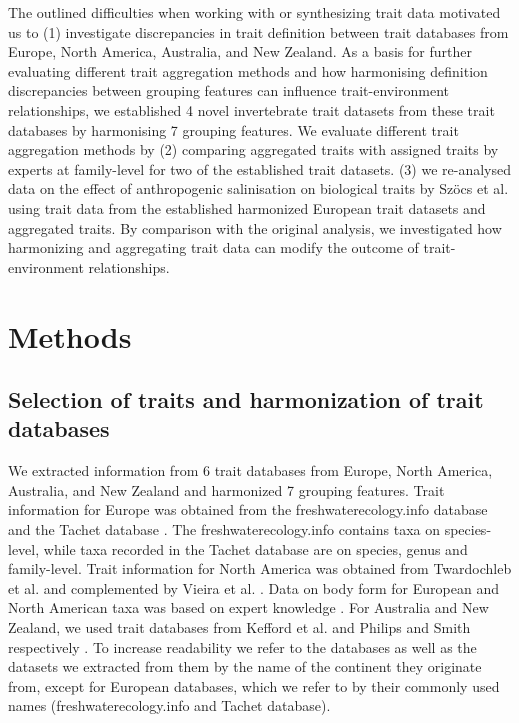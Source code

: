 \documentclass{article}
\begin{document}
The outlined difficulties when working with or synthesizing trait data motivated us to (1) investigate discrepancies in trait definition between trait databases from Europe, North America, Australia, and New Zealand. As a basis for further evaluating different trait aggregation methods and how harmonising definition discrepancies between grouping features can influence trait-environment relationships, we established 4 novel invertebrate trait datasets from these trait databases by harmonising 7 grouping features. We evaluate different trait aggregation methods by (2) comparing aggregated traits with assigned traits by experts at family-level for two of the established trait datasets. (3) we re-analysed data on the effect of anthropogenic salinisation on biological traits by Szöcs et al. \cite{szocs_effects_2014} using trait data from the established harmonized European trait datasets and aggregated traits. By comparison with the original analysis, we investigated how harmonizing and aggregating trait data can modify the outcome of trait-environment relationships.

\newpage

\section*{Methods}

\subsection*{Selection of traits and harmonization of trait databases}

We extracted information from 6 trait databases from Europe, North America, Australia, and New Zealand and harmonized 7 grouping features. Trait information for Europe was obtained from the freshwaterecology.info database \cite{schmidt-kloiber_www.freshwaterecology.info_2015} and the Tachet database \cite{usseglio-polatera_biomonitoring_2000}. The freshwaterecology.info contains taxa on species-level, while taxa recorded in the Tachet database are on species, genus and family-level. Trait information for North America was obtained from Twardochleb et al. \cite{twardochleb_trait_data_2020} and complemented by Vieira et al. \cite{vieira_database_nodate}. Data on body form for European and North American taxa was based on expert knowledge \cite{polatera_personal_information_2020}. For Australia and New Zealand, we used trait databases from Kefford et al. \cite{kefford_integrated_2020} and Philips and Smith respectively \cite{Philips_and_Smith_NZ_DB_2018}. To increase readability we refer to the databases as well as the datasets we extracted from them by the name of the continent they originate from, except for European databases, which we refer to by their commonly used names (freshwaterecology.info and Tachet database). 
 
\end{document}

